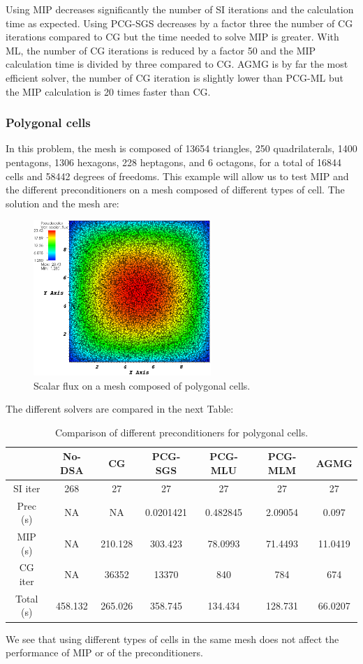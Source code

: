 Using MIP decreases significantly the number of SI iterations and the
calculation time as expected. Using PCG-SGS decreases by a 
factor three the number of CG iterations compared to CG but the time 
needed to solve MIP is greater. With ML, the number of CG iterations is 
reduced by a factor 50 and the MIP calculation time is divided by three 
compared to CG. AGMG is by far the most efficient solver, the number of 
CG iteration is slightly lower than PCG-ML but the MIP calculation is 20 
times faster than CG.

\subsubsection{Polygonal cells}
In this problem, the mesh is composed of 13654 triangles, 250 quadrilaterals,
1400 pentagons, 1306 hexagons, 228 heptagons, and 6 octagons, for a total of
16844 cells and 58442 degrees of freedoms. This example will allow us to test
MIP and the different preconditioners on a mesh composed of different types of
cell. The solution and the mesh are:
\begin{figure}[H]
\centering
\includegraphics[width=0.6\textwidth]{./Dsa/homog_poly_crop}
\caption{Scalar flux on a mesh composed of polygonal cells.}
\end{figure}
The different solvers are compared in the next Table:
\begin{table}[H]
\begin{center}
\caption{Comparison of different preconditioners for polygonal cells.}
\begin{tabular}{|c|c|c|c|c|c|c|}
\hline
& No-DSA & CG & PCG-SGS & PCG-MLU & PCG-MLM & AGMG\\
\hline
SI iter   & 268     & 27      & 27        & 27       & 27      & 27\\
Prec (s)  & NA      & NA      & 0.0201421 & 0.482845 & 2.09054 & 0.097\\
MIP (s)   & NA      & 210.128 & 303.423   & 78.0993  & 71.4493 & 11.0419\\
CG iter   & NA      & 36352   & 13370     & 840      & 784     & 674\\
Total (s) & 458.132 & 265.026 & 358.745   & 134.434  & 128.731 & 66.0207\\
\hline
\end{tabular}
\end{center}
\end{table}
We see that using different types of cells in the same mesh does not affect
the performance of MIP or of the preconditioners. 

